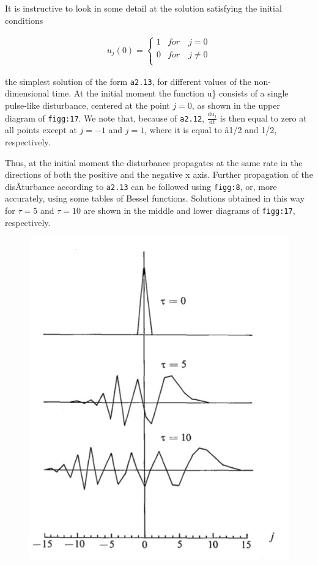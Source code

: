 It is instructive to look in some detail at the solution satisfying the
initial conditions

 {\[\begin{aligned}
     u_{j}\left( 0 \right) = \left\{ \begin{array}{cc}
                                      1  &  for \quad j = 0\\
                                      0  &  for \quad j \neq 0\\
     \end{array} \right.
\end{aligned}\]}

the simplest solution of the form \texttt{a2.13}, for different values
of the non-dimensional time. At the initial moment the function u\}
consists of a single pulse-like disturbance, centered at the point
\(j = 0\), as shown in the upper diagram of \texttt{figg:17}. We note
that, because of \texttt{a2.12}, \(\frac{\text{du}_{j}}{\text{dt}}\) is
then equal to zero at all points except at \(j = - 1\) and \(j = 1\),
where it is equal to â1/2 and 1/2, respectively.

Thus, at the initial moment the disturbance propagates at the same rate
in the directions of both the positive and the negative x axis. Further
propagation of the disÂ­turbance according to \texttt{a2.13} can be
followed using \texttt{figg:8}, or, more accurately, using some tables
of Bessel functions. Solutions obtained in this way for \(\tau = 5\) and
\(\tau = 10\) are shown in the middle and lower diagrams of
\texttt{figg:17}, respectively.

\begin{figure}
 \centering
 \includegraphics[keepaspectratio]{figs/NM/pic17.jpg}
 \caption{} \label{fig:}
\end{figure}

